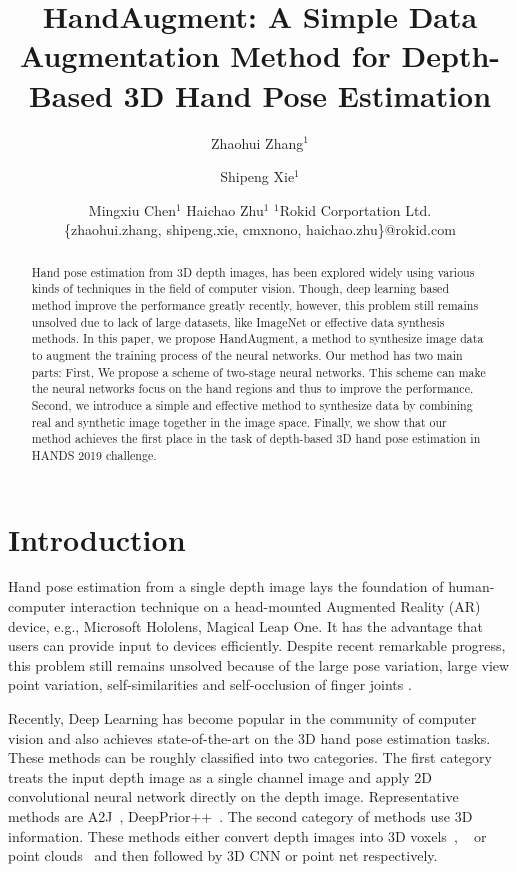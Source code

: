 \documentclass{article}
\title{HandAugment: A Simple Data Augmentation Method for Depth-Based 3D Hand Pose Estimation}
\author{
Zhaohui Zhang$^1$
\and
Shipeng Xie$^1$\and
Mingxiu Chen$^{1}$\And
Haichao Zhu$^1$
\affiliations
$^1$Rokid Corportation Ltd.\\
\emails
\{zhaohui.zhang, shipeng.xie, cmxnono, haichao.zhu\}@rokid.com
}
\begin{document}
\maketitle

\begin{abstract}
Hand pose estimation from 3D depth images, has been explored widely using various kinds of techniques in the field of computer vision. Though, deep learning based method improve the performance greatly recently, however, this problem still remains unsolved due to lack of large datasets, like ImageNet or effective data synthesis methods. In this paper, we propose HandAugment, a method to synthesize image data to augment the training process of the neural networks. Our method has two main parts: 
First, We propose a scheme of two-stage neural networks. This scheme can make the neural networks focus on the hand regions and thus to improve the performance.
Second, we introduce a simple and effective method to synthesize data by combining real and synthetic image together in the image space. 
Finally, we show that our method achieves the first place in the task of depth-based 3D hand pose estimation in HANDS 2019 challenge.
\end{abstract}

\section{Introduction}
Hand pose estimation from a single depth image lays the foundation of human-computer interaction
technique on a head-mounted Augmented Reality (AR) device,
e.g., Microsoft Hololens, Magical Leap One. It has the advantage that users can provide input to devices efficiently. 
Despite recent remarkable progress, this problem still remains unsolved because of the large pose variation, large view point variation, self-similarities and self-occlusion of finger joints .

Recently, Deep Learning has become popular in the community of computer vision and also achieves state-of-the-art on the 3D hand pose estimation tasks. These methods can be roughly classified into two categories. The first category treats the input depth image as a single channel image and apply 2D convolutional neural network directly on the depth image. Representative methods are A2J~\cite{xiong2019a2j}, DeepPrior++~\cite{oberweger2017deepprior++}. The second category of methods use 3D information. These methods either convert depth images into 3D voxels~\cite{moon2018v2v}, ~\cite{ge20173d} or point clouds~\cite{ge2018hand} and then followed by 3D CNN or point net respectively.
\end{document}
